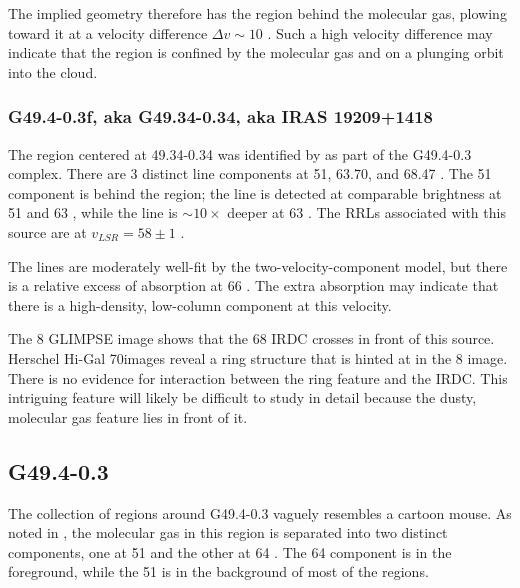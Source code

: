 The implied geometry therefore has the \hii region behind the molecular gas,
plowing toward it at a velocity difference $\Delta v \sim 10$ \kms.  Such a
high velocity difference may indicate that the \hii region is confined by the
molecular gas and on a plunging orbit into the cloud.

\subsubsection{G49.4-0.3f, aka G49.34-0.34, aka IRAS 19209+1418}
The \hii region centered at 49.34-0.34 was identified by \citet{Mehringer1994a}
as part of the G49.4-0.3 complex.  There are 3 distinct \formaldehyde line
components at 51, 63.70, and 68.47 \kms.  The 51 \kms component is behind the \hii
region; the \thirteenco line is detected at comparable brightness at 51 \kms
and 63 \kms, while the \formaldehyde \oneone line is $\sim10\times$ deeper at
63 \kms.  The RRLs associated with this source are at $v_{LSR}=58 \pm 1$ \kms.

The \formaldehyde lines are moderately well-fit by the two-velocity-component
model, but there is a relative excess of \twotwo absorption at 66 \kms.  The
extra absorption may indicate that there is a high-density, low-column
component at this velocity.

The 8 \um GLIMPSE image shows that the 68 \kms IRDC crosses in front of this
source.  Herschel Hi-Gal 70\um images reveal a ring structure that is hinted at
in the 8 \um image.  There is no evidence for interaction between the ring
feature and the IRDC.  This intriguing feature will likely be difficult to
study in detail because the dusty, molecular gas feature lies in front of it.

\subsection{G49.4-0.3}
\label{sec:maus}
The collection of \hii regions around G49.4-0.3 vaguely resembles a cartoon
mouse.  As noted in \citet{Carpenter1998a}, the molecular gas in this region is
separated into two distinct components, one at 51 \kms and the other at 64
\kms.  The 64 \kms component is in the foreground, while the 51 \kms is in the
background of most of the \hii regions.  

